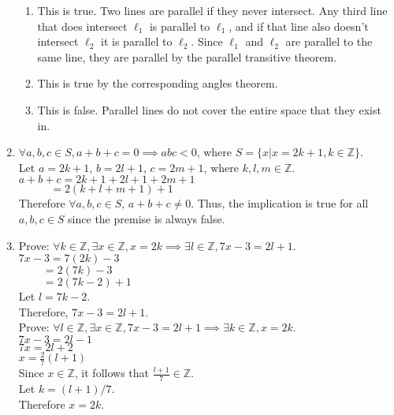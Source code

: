 \documentclass[12pt]{article}
\begin{document}
\begin{enumerate}
\begin{enumerate}
            \item This is true. Two lines are parallel if they never intersect. Any third line that does intersect \(\ell_1\) is parallel to \(\ell_1\), and if that line also doesn't intersect \(\ell_2\) it is parallel to \(\ell_2\). Since \(\ell_1\) and \(\ell_2\) are parallel to the same line, they are parallel by the parallel transitive theorem.
            \item This is true by the corresponding angles theorem.
            \item This is false. Parallel lines do not cover the entire space that they exist in.
        \end{enumerate}
        \item \(\forall a,b,c \in S, a + b + c = 0 \implies abc < 0\), where \(S = \{x |x = 2k + 1, k\in\mathbb{Z}\}\).\\
        Let \(a = 2k+1\), \(b=2l + 1\), \(c = 2m + 1\), where \(k, l, m \in \mathbb{Z}\). \\
        \(a + b + c= 2k+1 + 2l+1 + 2m+1\)\\
        \(~~~~~~~~~~~~\, =2(k+l+m + 1) + 1\)\\
        Therefore \(\forall a, b, c\in S\), \(a + b + c \neq 0\). Thus, the implication is true for all \(a, b, c \in S\) since the premise is always false. 
        \item Prove: \(\forall k \in \mathbb{Z}, \exists x \in \mathbb{Z}, x=2k \implies \exists l \in \mathbb{Z}, 7x-3 = 2l + 1\).\\
        \(7x-3 = 7(2k)-3\)\\
        \(~~~~~~~~~\,=2(7k)-3\)\\
        \(~~~~~~~~~\,=2(7k-2) + 1\)\\
        Let \(l = 7k-2\).\\
        Therefore, \(7x-3=2l+1\).\\
        Prove: \(\forall l \in \mathbb{Z}, \exists x \in \mathbb{Z}, 7x-3 = 2l + 1 \implies \exists k \in \mathbb{Z}, x = 2k \). \\
        \(7x-3=2l-1\)\\
        \(7x = 2l+2\)\\
        \(x = \frac{2}{7}(l+1)\)\\
        Since \(x \in \mathbb{Z}\), it follows that \(\frac{l+1}{7} \in \mathbb{Z}\). \\
        Let \(k=(l+1)/7\).\\
        Therefore \(x = 2k\).\\\\\\

\end{enumerate}
\end{document}
